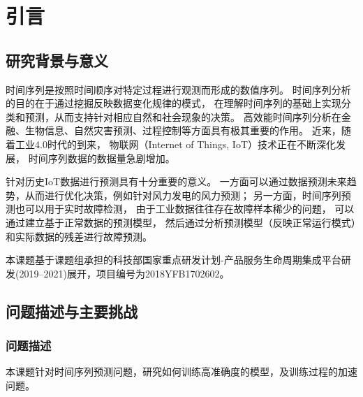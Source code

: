 
\chapter{引言}

\section{研究背景与意义}
时间序列是按照时间顺序对特定过程进行观测而形成的数值序列。
时间序列分析的目的在于通过挖掘反映数据变化规律的模式，
在理解时间序列的基础上实现分类和预测，从而支持针对相应自然和社会现象的决策。
高效能时间序列分析在金融、生物信息、自然灾害预测、过程控制等方面具有极其重要的作用。
近来，随着工业4.0时代的到来，
物联网（Internet of Things, IoT）技术正在不断深化发展，
时间序列数据的数据量急剧增加。

针对历史IoT数据进行预测具有十分重要的意义。
一方面可以通过数据预测未来趋势，从而进行优化决策，例如针对风力发电的风力预测；
另一方面，时间序列预测也可以用于实时故障检测，
由于工业数据往往存在故障样本稀少的问题，
可以通过建立基于正常数据的预测模型，
然后通过分析预测模型（反映正常运行模式）和实际数据的残差进行故障预测。

本课题基于课题组承担的科技部国家重点研发计划-产品服务生命周期集成平台研发(2019–2021)展开，项目编号为2018YFB1702602。

\section{问题描述与主要挑战}
\subsection{问题描述}
本课题针对时间序列预测问题，研究如何训练高准确度的模型，及训练过程的加速问题。

